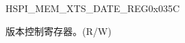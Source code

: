\begin{register}{H}{SPI\_MEM\_XTS\_DATE\_REG}{0x035C}\label{regdesc:SPIMEMXTSDATEREG}
%
%
\regnewline%
\begin{regdesc}\begin{reglist}
\label{fielddesc:SPIMEMXTSDATE}\item [SPI\_MEM\_XTS\_DATE] 版本控制寄存器。(R/W)
\end{reglist}\end{regdesc}
\end{register}
